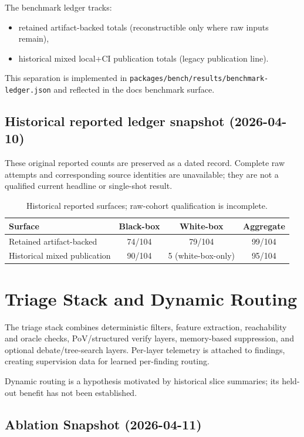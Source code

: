 \documentclass[11pt]{article}
\begin{document}
The benchmark ledger tracks:
\begin{itemize}
  \item retained artifact-backed totals (reconstructible only where raw inputs remain),
  \item historical mixed local+CI publication totals (legacy publication line).
\end{itemize}

This separation is implemented in
\texttt{packages/bench/results/benchmark-ledger.json} and reflected in the
docs benchmark surface.

\subsection{Historical reported ledger snapshot (2026-04-10)}
These original reported counts are preserved as a dated record. Complete raw
attempts and corresponding source identities are unavailable; they are not a
qualified current headline or single-shot result.

\begin{table}[ht]
\centering
\small
\begin{tabular}{lccc}
\toprule
Surface & Black-box & White-box & Aggregate \\
\midrule
Retained artifact-backed & 74/104 & 79/104 & 99/104 \\
Historical mixed publication & 90/104 & 5 (white-box-only) & 95/104 \\
\bottomrule
\end{tabular}
\caption{Historical reported surfaces; raw-cohort qualification is incomplete.}
\label{tab:ledger}
\end{table}

\section{Triage Stack and Dynamic Routing}

The triage stack combines deterministic filters, feature extraction,
reachability and oracle checks, PoV/structured verify layers, memory-based
suppression, and optional debate/tree-search layers. Per-layer telemetry is
attached to findings, creating supervision data for learned per-finding routing.

Dynamic routing is a hypothesis motivated by historical slice summaries;
its held-out benefit has not been established.

\subsection{Ablation Snapshot (2026-04-11)}
\end{document}

